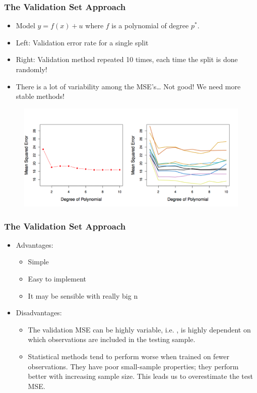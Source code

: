 \documentclass[
  shownotes,
  xcolor={svgnames},
  hyperref={colorlinks,citecolor=DarkBlue,linkcolor=DarkRed,urlcolor=DarkBlue}
  , aspectratio=169]{beamer}
\begin{document}
\begin{frame}[fragile]
\frametitle{The Validation Set Approach}
\begin{itemize}
\item Model $y=f(x) +u$ where $f$ is a polynomial of degree $p^*$. 
\scriptsize
\item Left: Validation error rate for a single split 
\item Right: Validation method repeated 10 times, each time the split is done randomly! 
\item  There is a lot of variability among the MSE’s… Not good! We need more stable methods!
\end{itemize}


 \begin{figure}[H] \centering
            \captionsetup{justification=centering}
              \includegraphics[scale=0.7]{figures/fig52.png}
       \end{figure}
\end{frame}
\begin{frame}[fragile]
\frametitle{The Validation Set Approach}

\begin{itemize}
  \item Advantages:
  \medskip
    \begin{itemize}
      \item Simple
      \medskip
      \item Easy to implement
      \medskip
      \item It may be sensible with really big n
    \end{itemize}
  \item Disadvantages:
  \medskip
    \begin{itemize}
      \item The validation MSE can be highly variable, i.e. , is highly dependent on which observations are included in the testing sample.
      \medskip
      \item Statistical methods tend to perform worse when trained on fewer observations. They have poor small-sample properties; they perform better with increasing sample size. This leads us to overestimate the test MSE.
      
\end{itemize}
\end{itemize}

\end{frame}
\end{document}
